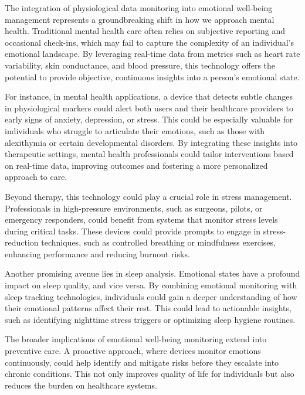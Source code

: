 \documentclass[12pt, research paper]{report}
\begin{document}
	\noindent The integration of physiological data monitoring into emotional well-being management represents a groundbreaking shift in how we approach mental health. Traditional mental health care often relies on subjective reporting and occasional check-ins, which may fail to capture the complexity of an individual's emotional landscape. By leveraging real-time data from metrics such as heart rate variability, skin conductance, and blood pressure, this technology offers the potential to provide objective, continuous insights into a person’s emotional state.
	\bigskip
	
	\noindent For instance, in mental health applications, a device that detects subtle changes in physiological markers could alert both users and their healthcare providers to early signs of anxiety, depression, or stress. This could be especially valuable for individuals who struggle to articulate their emotions, such as those with alexithymia or certain developmental disorders. By integrating these insights into therapeutic settings, mental health professionals could tailor interventions based on real-time data, improving outcomes and fostering a more personalized approach to care.
	\bigskip
	
	\noindent Beyond therapy, this technology could play a crucial role in stress management. Professionals in high-pressure environments, such as surgeons, pilots, or emergency responders, could benefit from systems that monitor stress levels during critical tasks. These devices could provide prompts to engage in stress-reduction techniques, such as controlled breathing or mindfulness exercises, enhancing performance and reducing burnout risks.
	\bigskip
	
	\noindent Another promising avenue lies in sleep analysis. Emotional states have a profound impact on sleep quality, and vice versa. By combining emotional monitoring with sleep tracking technologies, individuals could gain a deeper understanding of how their emotional patterns affect their rest. This could lead to actionable insights, such as identifying nighttime stress triggers or optimizing sleep hygiene routines.
	\bigskip
	
	\noindent The broader implications of emotional well-being monitoring extend into preventive care. A proactive approach, where devices monitor emotions continuously, could help identify and mitigate risks before they escalate into chronic conditions. This not only improves quality of life for individuals but also reduces the burden on healthcare systems.
	\bigskip
	
\end{document}
